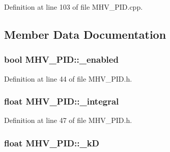 \-Definition at line 103 of file \-M\-H\-V\-\_\-\-P\-I\-D.\-cpp.



\subsection{\-Member \-Data \-Documentation}
\hypertarget{class_m_h_v___p_i_d_a17e676a4ac1b18dcf30417b73265e87f}{
\subsubsection[{\-\_\-enabled}]{\setlength{\rightskip}{0pt plus 5cm}bool {\bf \-M\-H\-V\-\_\-\-P\-I\-D\-::\-\_\-enabled}}}
\label{class_m_h_v___p_i_d_a17e676a4ac1b18dcf30417b73265e87f}


\-Definition at line 44 of file \-M\-H\-V\-\_\-\-P\-I\-D.\-h.

\hypertarget{class_m_h_v___p_i_d_a26def3787ab18a8681c361720090b0df}{
\subsubsection[{\-\_\-integral}]{\setlength{\rightskip}{0pt plus 5cm}float {\bf \-M\-H\-V\-\_\-\-P\-I\-D\-::\-\_\-integral}}}
\label{class_m_h_v___p_i_d_a26def3787ab18a8681c361720090b0df}


\-Definition at line 47 of file \-M\-H\-V\-\_\-\-P\-I\-D.\-h.

\hypertarget{class_m_h_v___p_i_d_a64e69c4f8d1823d16314c88f98a4e18b}{
\subsubsection[{\-\_\-k\-D}]{\setlength{\rightskip}{0pt plus 5cm}float {\bf \-M\-H\-V\-\_\-\-P\-I\-D\-::\-\_\-k\-D}}}
\label{class_m_h_v___p_i_d_a64e69c4f8d1823d16314c88f98a4e18b}


